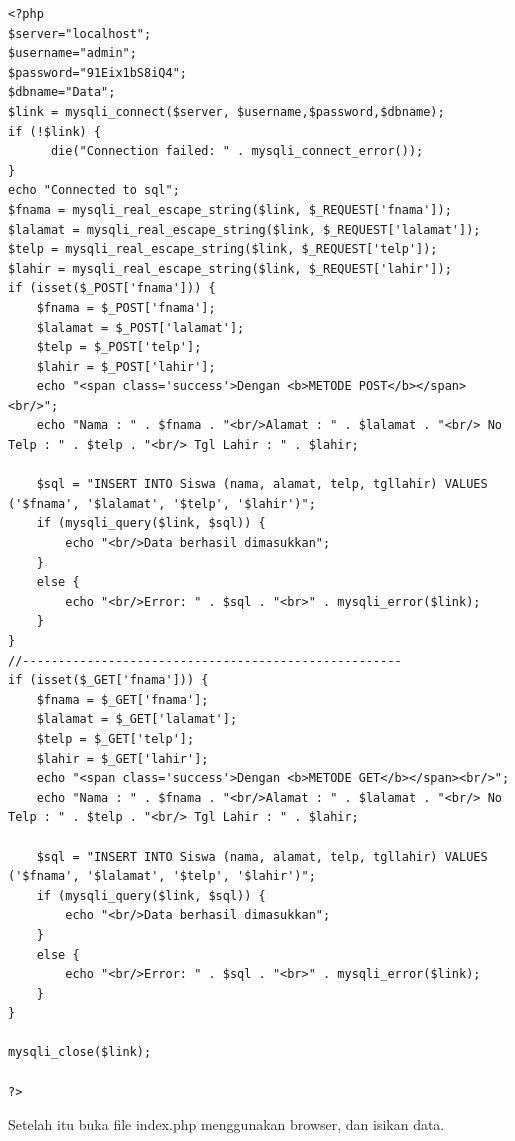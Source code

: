 \documentclass[a4paper,12pt]{article}
\begin{document}
\begin{lstlisting}[style=PHP]
<?php
$server="localhost";
$username="admin";
$password="91Eix1bS8iQ4";
$dbname="Data";
$link = mysqli_connect($server, $username,$password,$dbname);
if (!$link) {
      die("Connection failed: " . mysqli_connect_error());
}
echo "Connected to sql";
$fnama = mysqli_real_escape_string($link, $_REQUEST['fnama']);
$lalamat = mysqli_real_escape_string($link, $_REQUEST['lalamat']);
$telp = mysqli_real_escape_string($link, $_REQUEST['telp']);
$lahir = mysqli_real_escape_string($link, $_REQUEST['lahir']);
if (isset($_POST['fnama'])) {
    $fnama = $_POST['fnama'];
    $lalamat = $_POST['lalamat'];
    $telp = $_POST['telp'];
    $lahir = $_POST['lahir'];
    echo "<span class='success'>Dengan <b>METODE POST</b></span><br/>";
    echo "Nama : " . $fnama . "<br/>Alamat : " . $lalamat . "<br/> No Telp : " . $telp . "<br/> Tgl Lahir : " . $lahir;

    $sql = "INSERT INTO Siswa (nama, alamat, telp, tgllahir) VALUES ('$fnama', '$lalamat', '$telp', '$lahir')";
    if (mysqli_query($link, $sql)) {
        echo "<br/>Data berhasil dimasukkan";
    }
    else {
        echo "<br/>Error: " . $sql . "<br>" . mysqli_error($link);
    }
}
//-----------------------------------------------------
if (isset($_GET['fnama'])) {
    $fnama = $_GET['fnama'];
    $lalamat = $_GET['lalamat'];
    $telp = $_GET['telp'];
    $lahir = $_GET['lahir'];
    echo "<span class='success'>Dengan <b>METODE GET</b></span><br/>";
    echo "Nama : " . $fnama . "<br/>Alamat : " . $lalamat . "<br/> No Telp : " . $telp . "<br/> Tgl Lahir : " . $lahir;

    $sql = "INSERT INTO Siswa (nama, alamat, telp, tgllahir) VALUES ('$fnama', '$lalamat', '$telp', '$lahir')";
    if (mysqli_query($link, $sql)) {
        echo "<br/>Data berhasil dimasukkan";
    }
    else {
        echo "<br/>Error: " . $sql . "<br>" . mysqli_error($link);
    }
}
    
mysqli_close($link);

?>
\end{lstlisting}
Setelah itu buka file index.php menggunakan browser, dan isikan data.
\end{document}
